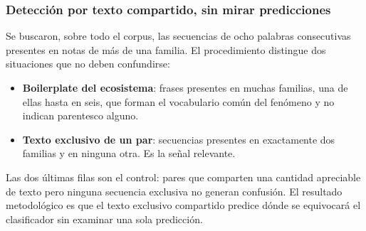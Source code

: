 \subsubsection*{Detección por texto compartido, sin mirar predicciones}

Se buscaron, sobre todo el corpus, las secuencias de ocho palabras consecutivas presentes en notas de más de una familia. El procedimiento distingue dos situaciones que no deben confundirse:

\begin{itemize}
  \item \textbf{Boilerplate del ecosistema}: frases presentes en muchas familias, una de ellas hasta en seis, que forman el vocabulario común del fenómeno y no indican parentesco alguno.
  \item \textbf{Texto exclusivo de un par}: secuencias presentes en exactamente dos familias y en ninguna otra. Es la señal relevante.
\end{itemize}

\begin{table}[ht]
\centering
\caption{Pares de familias que comparten texto exclusivo, y confusión que producen (149 notas, P2bal)}
\label{tab:linaje}
\end{table}

Las dos últimas filas son el control: pares que comparten una cantidad apreciable de texto pero ninguna secuencia exclusiva no generan confusión. El resultado metodológico es que el texto exclusivo compartido predice dónde se equivocará el clasificador sin examinar una sola predicción.

